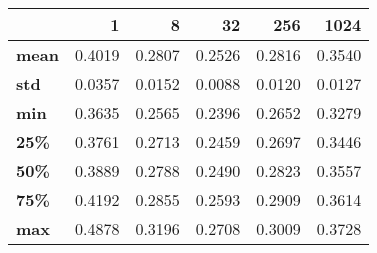 \begin{tabular}{lrrrrr}
\toprule
{} &       1 &       8 &      32 &     256 &    1024 \\
\midrule
\textbf{mean} &  0.4019 &  0.2807 &  0.2526 &  0.2816 &  0.3540 \\
\textbf{std } &  0.0357 &  0.0152 &  0.0088 &  0.0120 &  0.0127 \\
\textbf{min } &  0.3635 &  0.2565 &  0.2396 &  0.2652 &  0.3279 \\
\textbf{25\% } &  0.3761 &  0.2713 &  0.2459 &  0.2697 &  0.3446 \\
\textbf{50\% } &  0.3889 &  0.2788 &  0.2490 &  0.2823 &  0.3557 \\
\textbf{75\% } &  0.4192 &  0.2855 &  0.2593 &  0.2909 &  0.3614 \\
\textbf{max } &  0.4878 &  0.3196 &  0.2708 &  0.3009 &  0.3728 \\
\bottomrule
\end{tabular}
